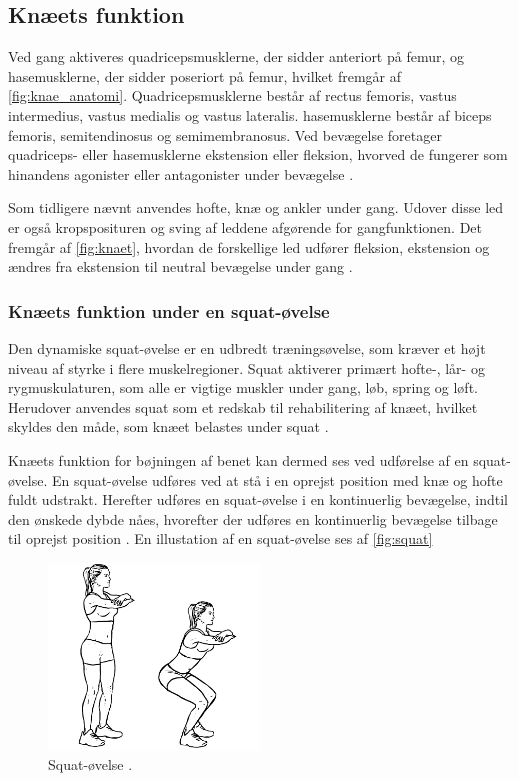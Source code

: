 \subsection{Knæets funktion}
Ved gang aktiveres quadricepsmusklerne, der sidder anteriort på femur, og hasemusklerne, der sidder poseriort på femur, hvilket fremgår af \autoref{fig:knae_anatomi}. Quadricepsmusklerne består af rectus femoris, vastus intermedius, vastus medialis og vastus lateralis. hasemusklerne består af biceps femoris, semitendinosus og semimembranosus. Ved bevægelse foretager quadriceps- eller hasemusklerne ekstension eller fleksion, hvorved de fungerer som hinandens agonister eller antagonister under bevægelse \citep{martini2012}. 

Som tidligere nævnt anvendes hofte, knæ og ankler under gang. Udover disse led er også kropsposituren og sving af leddene afgørende for gangfunktionen. Det fremgår af \autoref{fig:knaet}, hvordan de forskellige led udfører fleksion, ekstension og ændres fra ekstension til neutral bevægelse under gang \citep{martini2012}.

\subsubsection{Knæets funktion under en squat-øvelse}
Den dynamiske squat-øvelse er en udbredt træningsøvelse, som kræver et højt niveau af styrke i flere muskelregioner. Squat aktiverer primært hofte-, lår- og rygmuskulaturen, som alle er vigtige muskler under gang, løb, spring og løft. Herudover anvendes squat som et redskab til rehabilitering af knæet, hvilket skyldes den måde, som knæet belastes under squat \citep{escamilla2001}. 

Knæets funktion for bøjningen af benet kan dermed ses ved udførelse af en squat-øvelse. En squat-øvelse udføres ved at stå i en oprejst position med knæ og hofte fuldt udstrakt. Herefter udføres en squat-øvelse i en kontinuerlig bevægelse, indtil den ønskede dybde nåes, hvorefter der udføres en kontinuerlig bevægelse tilbage til oprejst position \citep{escamilla2001}. En illustation af en squat-øvelse ses af \autoref{fig:squat}

\begin{figure}[H]
\centering
\includegraphics[width=0.5\textwidth]{figures/squat.png}
\caption{Squat-øvelse \citep{squat2015}.}
\label{fig:squat}
\end{figure}

